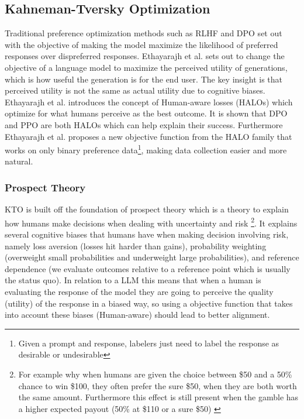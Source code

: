 \subsection{Kahneman-Tversky Optimization}

Traditional preference optimization methods such as RLHF and DPO set out with the objective of making the model maximize the likelihood of preferred responses over dispreferred responses. Ethayarajh et al. \cite{ethayarajhKTOModelAlignment2024} sets out to change the objective of a language model to maximize the perceived utility of generations, which is how useful the generation is for the end user. The key insight is that perceived utility is not the same as actual utility due to cognitive biases. Ethayarajh et al. introduces the concept of Human-aware losses (HALOs) which optimize for what humans perceive as the best outcome. It is shown that DPO and PPO are both HALOs which can help explain their success. Furthermore Ethayarajh et al. proposes a new objective function from the HALO family that works on only binary preference data\footnote{Given a prompt and response, labelers just need to label the response as desirable or undesirable}, making data collection easier and more natural.

\subsubsection{Prospect Theory}

KTO is built off the foundation of prospect theory \cite{tverskyAdvancesProspectTheory1992} which is a theory to explain how humans make decisions when dealing with uncertainty and risk \footnote{For example why when humans are given the choice between \$50 and a 50\% chance to win \$100, they often prefer the sure \$50, when they are both worth the same amount. Furthermore this effect is still present when the gamble has a higher expected payout (50\% at \$110 or a sure \$50) \cite{kahnemanProspectTheory1979}}. It explains several cognitive biases that humans have when making decision involving risk, namely loss aversion (losses hit harder than gains), probability weighting (overweight small probabilities and underweight large probabilities), and reference dependence (we evaluate outcomes relative to a reference point which is usually the status quo). In relation to a LLM this means that when a human is evaluating the response of the model they are going to perceive the quality (utility) of the response in a biased way, so using a objective function that takes into account these biases (Human-aware) should lead to better alignment.

